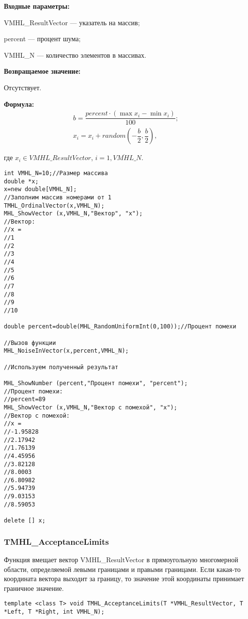 \documentclass[a4paper,12pt]{article}
\begin{document}
\textbf{Входные параметры:}  

 VMHL\_ResultVector --- указатель на массив;
 
 percent --- процент шума;
 
 VMHL\_N --- количество элементов в массивах.

\textbf{Возвращаемое значение:}

Отсутствует.

\textbf{Формула:}
\begin{eqnarray*}
b=\dfrac{percent\cdot\left( \max{x_i}-\min{x_i}\right)}{100};\\
x_i=x_i+random \left( -\dfrac{b}{2},\dfrac{b}{2}\right),
\end{eqnarray*}

где $x_i \in VMHL\_ResultVector$, $i=\overline{1,VMHL\_N}$.


\begin{lstlisting}[label=code_use_MHL_NoiseInVector,caption=Пример использования]
int VMHL_N=10;//Размер массива
double *x;
x=new double[VMHL_N];
//Заполним массив номерами от 1
TMHL_OrdinalVector(x,VMHL_N);
MHL_ShowVector (x,VMHL_N,"Вектор", "x");
//Вектор:
//x =
//1
//2
//3
//4
//5
//6
//7
//8
//9
//10

double percent=double(MHL_RandomUniformInt(0,100));//Процент помехи

//Вызов функции
MHL_NoiseInVector(x,percent,VMHL_N);

//Используем полученный результат

MHL_ShowNumber (percent,"Процент помехи", "percent");
//Процент помехи:
//percent=89
MHL_ShowVector (x,VMHL_N,"Вектор с помехой", "x");
//Вектор с помехой:
//x =
//-1.95828
//2.17942
//1.76139
//4.45956
//3.82128
//8.0003
//6.80982
//5.94739
//9.03153
//8.59053

delete [] x;
\end{lstlisting}

\subsubsection{TMHL\_AcceptanceLimits}\label{TMHL_AcceptanceLimits}

Функция вмещает вектор VMHL\_ResultVector в прямоугольную многомерной области, определяемой левыми границами и правыми границами. Если какая-то координата вектора выходит за границу, то значение этой координаты принимает граничное значение.


\begin{lstlisting}[label=code_syntax_TMHL_AcceptanceLimits,caption=Синтаксис]
template <class T> void TMHL_AcceptanceLimits(T *VMHL_ResultVector, T *Left, T *Right, int VMHL_N);
\end{lstlisting}
\end{document}

